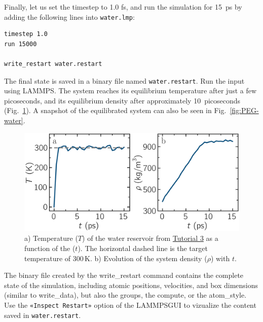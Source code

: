 \documentclass[9pt,tutorial]{livecoms}
\newcommand{\lmpcmdnote}[1]{\hspace{0pt}\colorbox{note_listing}{\textcolor{command}{\small{#1}}}\hspace{0pt}} %
\newcommand{\flecmd}[1]{\textcolor{command}{\texttt{#1}}} %
\newcommand{\guicmd}[1]{\textcolor{command}{\texttt{«#1»}}} %
\newcommand{\lammpsgui}{\textsf{LAMMPS\textendash GUI}}
\begin{document}
Finally, let us set the timestep to 1.0 fs, and run the simulation for 15~ps by
adding the following lines into \flecmd{water.lmp}:
\begin{lstlisting}
timestep 1.0
run 15000

write_restart water.restart
\end{lstlisting}
The final state is saved in a binary file named \flecmd{water.restart}.
Run the input using LAMMPS.  The system reaches its equilibrium temperature
after just a few picoseconds, and its equilibrium density after approximately
10~picoseconds (Fig.~\ref{fig:PEG-density}).  A snapshot of the equilibrated
system can also be seen in Fig.~\ref{fig:PEG-water}.

\begin{figure}
\centering
\includegraphics[width=\linewidth]{PEG-density}
\caption{a) Temperature ($T$) of the water reservoir from
\hyperref[all-atom-label]{Tutorial 3} as a function of the ($t$).  The horizontal dashed line is
the target temperature of 300\,K.  b) Evolution of the system density ($\rho$) with $t$.}
\label{fig:PEG-density}
\end{figure}

\begin{note}
The binary file created by the \lmpcmdnote{write\_restart} command contains the
complete state of the simulation, including atomic positions, velocities, and
box dimensions (similar to \lmpcmdnote{write\_data}), but also the groups,
the compute, or the \lmpcmdnote{atom\_style}.  Use the \guicmd{Inspect Restart}
option of the \lammpsgui{} to vizualize the content saved in \flecmd{water.restart}.
\end{note}
\end{document}
